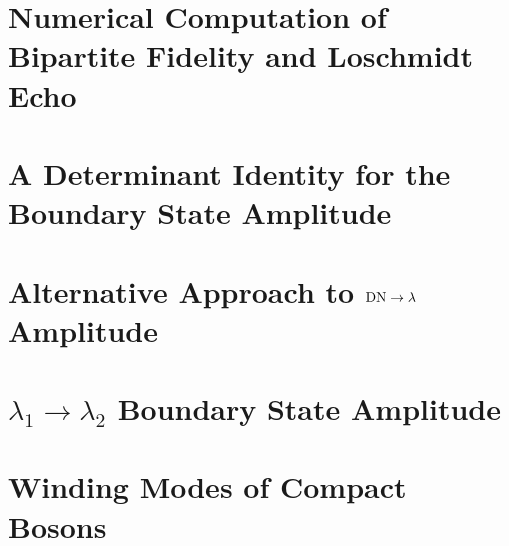 \documentclass[preprint, prb]{revtex4-1}
\begin{document}
\section{Numerical Computation of Bipartite Fidelity and Loschmidt Echo}
\label{app:comp_fid_echo}


\section{A Determinant Identity for the Boundary State Amplitude}
\label{app:pf_of_id}


\section{Alternative Approach to ${\rm DN} \rightarrow \lambda$ Amplitude}
\label{app:gnd_dn_lambda}


\section{$\lambda_1 \rightarrow \lambda_2$ Boundary State Amplitude}
\label{app:lambda_12}


\section{Winding Modes of Compact Bosons}
\label{app:compact_diff_boson}




\end{document}
